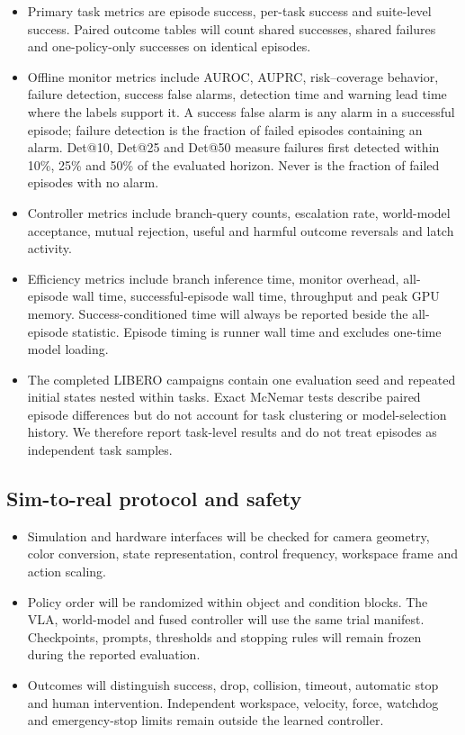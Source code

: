 \begin{itemize}
  \item Primary task metrics are episode success, per-task success and
  suite-level success. Paired outcome tables will count shared successes,
  shared failures and one-policy-only successes on identical episodes.

  \item Offline monitor metrics include AUROC, AUPRC, risk--coverage behavior,
  failure detection, success false alarms, detection time and warning lead time
  where the labels support it. A success false alarm is any alarm in a successful
  episode; failure detection is the fraction of failed episodes containing an
  alarm. Det@10, Det@25 and Det@50 measure failures first detected within 10\%,
  25\% and 50\% of the evaluated horizon. Never is the fraction of failed
  episodes with no alarm.

  \item Controller metrics include branch-query counts, escalation rate,
  world-model acceptance, mutual rejection, useful and harmful outcome
  reversals and latch activity.

  \item Efficiency metrics include branch inference time, monitor overhead,
  all-episode wall time, successful-episode wall time, throughput and peak GPU
  memory. Success-conditioned time will always be reported beside the
  all-episode statistic. Episode timing is runner wall time and excludes
  one-time model loading.

  \item The completed LIBERO campaigns contain one evaluation seed and repeated
  initial states nested within tasks. Exact McNemar tests describe paired
  episode differences but do not account for task clustering or model-selection
  history. We therefore report task-level results and do not treat episodes as
  independent task samples.
\end{itemize}

\subsection{Sim-to-real protocol and safety}

\begin{itemize}
  \item Simulation and hardware interfaces will be checked for camera geometry,
  color conversion, state representation, control frequency, workspace frame
  and action scaling.

  \item Policy order will be randomized within object and condition blocks. The
  VLA, world-model and fused controller will use the same trial manifest.
  Checkpoints, prompts, thresholds and stopping rules will remain frozen during
  the reported evaluation.

  \item Outcomes will distinguish success, drop, collision, timeout, automatic
  stop and human intervention. Independent workspace, velocity, force,
  watchdog and emergency-stop limits remain outside the learned controller.
\end{itemize}
